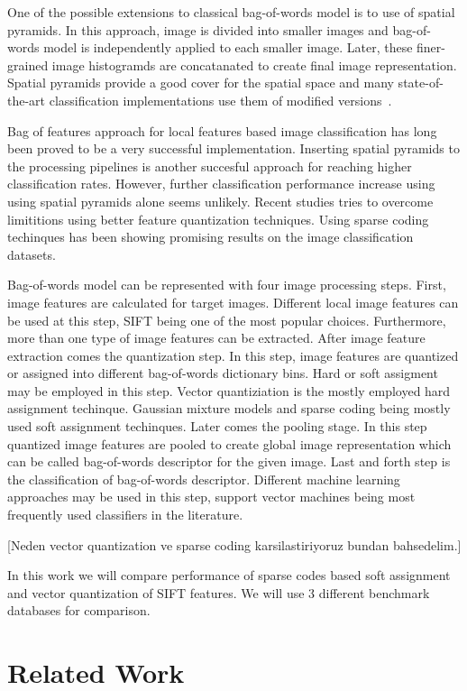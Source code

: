 \documentclass[conference]{IEEEtran}
\begin{document}
One of the possible extensions to classical bag-of-words model is to use of spatial pyramids. In this approach, image is divided into smaller images and bag-of-words model is independently applied to each smaller image. Later, these finer-grained image histogramds are concatanated to create final image representation. Spatial pyramids provide a good cover for the spatial space and many state-of-the-art classification implementations use them of modified versions~\cite{6248076}.

Bag of features approach for local features based image classification has long been proved to be a very successful implementation. Inserting spatial pyramids to the processing pipelines is another succesful approach for reaching higher classification rates. However, further classification performance increase using using spatial pyramids alone seems unlikely. Recent studies tries to overcome limititions using better feature quantization techniques. Using sparse coding techinques has been showing promising results on the image classification datasets.

Bag-of-words model can be represented with four image processing steps. First, image features are calculated for target images. Different local image features can be used at this step, SIFT being one of the most popular choices. Furthermore, more than one type of image features can be extracted. After image feature extraction comes the quantization step. In this step, image features are quantized or assigned into different bag-of-words dictionary bins. Hard or soft assigment may be employed in this step. Vector quantiziation is the mostly employed hard assignment techinque. Gaussian mixture models and sparse coding being mostly used soft assignment techinques. Later comes the pooling stage. In this step quantized image features are pooled to create global image representation which can be called bag-of-words descriptor for the given image. Last and forth step is the classification of bag-of-words descriptor. Different machine learning approaches may be used in this step, support vector machines being most frequently used classifiers in the literature.

[Neden vector quantization ve sparse coding karsilastiriyoruz bundan bahsedelim.]

In this work we will compare performance of sparse codes based soft assignment and vector quantization of SIFT features. We will use 3 different benchmark databases for comparison.

\section {Related Work}
\end{document}
